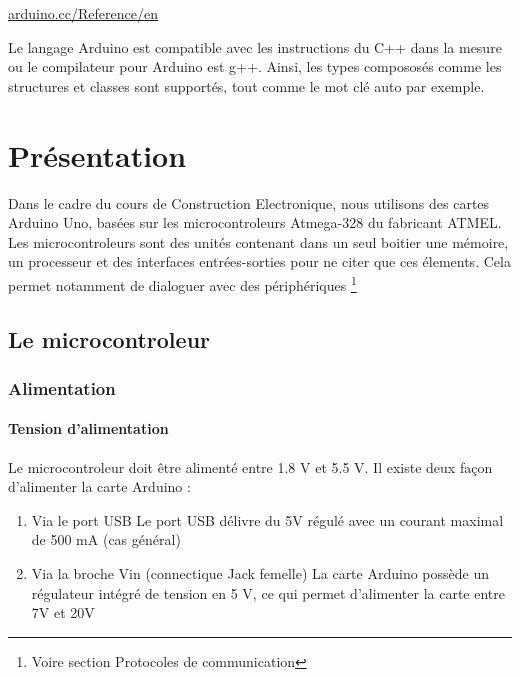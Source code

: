 \documentclass[12pt]{report}
\begin{document}
\underline{arduino.cc/Reference/en} \newline

Le langage Arduino est compatible avec les instructions du C++ dans la mesure ou le compilateur pour Arduino est g++.
Ainsi, les types compososés comme les structures et classes sont supportés, tout comme le mot clé auto par exemple.





\chapter{Présentation}

Dans le cadre du cours de Construction Electronique, nous utilisons des cartes Arduino Uno, basées sur les microcontroleurs Atmega-328 du fabricant ATMEL. \newline
Les microcontroleurs sont des unités contenant dans un seul boitier une mémoire, un processeur et des interfaces entrées-sorties pour ne citer que ces élements.
 \newline
 Cela permet notamment de dialoguer avec des périphériques \footnote{Voire section Protocoles de communication}

\section{Le microcontroleur}


\subsection {Alimentation}

\subsubsection {Tension d'alimentation}

Le microcontroleur doit être alimenté entre 1.8 V et 5.5 V. \newline
Il existe deux façon d'alimenter la carte Arduino : 

\begin{enumerate}
\item Via le port USB 
Le port USB délivre du 5V régulé avec un courant maximal de 500 mA (cas général)
\item Via la broche Vin (connectique Jack femelle)
La carte Arduino possède un régulateur intégré de tension en 5 V, ce qui permet d'alimenter la carte entre 7V et 20V

\end{enumerate}
\end{document}
